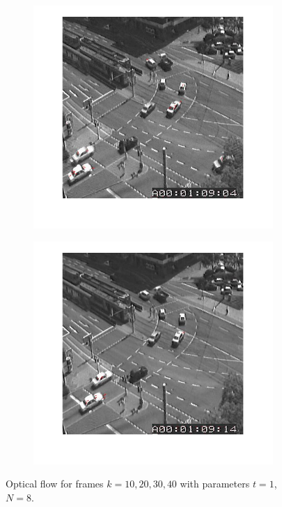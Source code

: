 \documentclass[a4paper]{iacas}
\begin{document}
\begin{figure}[!htbp]
\begin{subfigure}[b]{0.4\textwidth}
		\caption{}
		\label{fig:403}
	\end{subfigure}
	
	\begin{subfigure}[b]{0.4\textwidth}
		\includegraphics[width=\textwidth]{404.jpg}
		\caption{}
		\label{fig:404}
	\end{subfigure}
	\begin{subfigure}[b]{0.4\textwidth}
		\includegraphics[width=\textwidth]{405.jpg}
		\caption{}
		\label{fig:405}
	\end{subfigure}
	
	\caption{Optical flow for frames $k=10, 20, 30,40$ with parameters $t=1$, $N=8$.}
	\label{fig:400a}
\end{figure}
\end{document}
